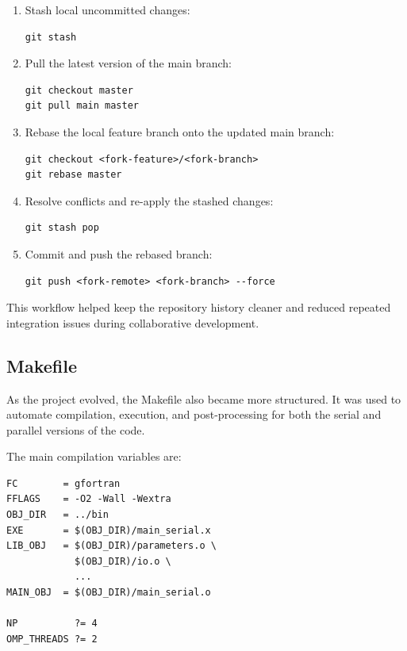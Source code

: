 \begin{enumerate}
  \item Stash local uncommitted changes:
\begin{verbatim}
git stash
\end{verbatim}

  \item Pull the latest version of the main branch:
\begin{verbatim}
git checkout master
git pull main master
\end{verbatim}

  \item Rebase the local feature branch onto the updated main branch:
\begin{verbatim}
git checkout <fork-feature>/<fork-branch>
git rebase master
\end{verbatim}

  \item Resolve conflicts and re-apply the stashed changes:
\begin{verbatim}
git stash pop
\end{verbatim}

  \item Commit and push the rebased branch:
\begin{verbatim}
git push <fork-remote> <fork-branch> --force
\end{verbatim}
\end{enumerate}

This workflow helped keep the repository history cleaner and reduced repeated integration issues during collaborative development.

\subsection{Makefile}\label{makefile}

As the project evolved, the Makefile also became more structured. It was used to automate compilation, execution, and post-processing for both the serial and parallel versions of the code.

The main compilation variables are:

\begin{verbatim}
FC        = gfortran
FFLAGS    = -O2 -Wall -Wextra
OBJ_DIR   = ../bin
EXE       = $(OBJ_DIR)/main_serial.x
LIB_OBJ   = $(OBJ_DIR)/parameters.o \
            $(OBJ_DIR)/io.o \
            ...
MAIN_OBJ  = $(OBJ_DIR)/main_serial.o

NP          ?= 4
OMP_THREADS ?= 2
\end{verbatim}

